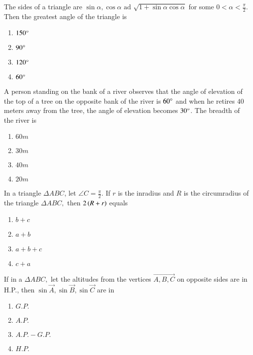 \item The sides of a triangle are $\sin\alpha,\cos\alpha \text{ ad } \sqrt{1+\sin\alpha\cos\alpha}$ for some $0<\alpha<\frac{\pi}{2}.$ Then the greatest angle of the triangle is \hfill{}
\begin{multicols}{4}
\begin{enumerate}
        \item $150\degree$                    
        \item $90\degree$ 
        \item $120\degree$
        \item $60\degree$
\end{enumerate}
\end{multicols} 

\item A person standing on the bank of a river observes that the angle of elevation of the top of a tree on the opposite bank of the river is $60\degree$ and when he retires $40$ meters away from the tree, the angle of elevation becomes $30\degree$. The breadth of the river is 

\hfill{}
\begin{multicols}{4}
\begin{enumerate}
        \item $60m$                    
        \item $30m$ 
        \item $40m$ 
        \item $20m$
\end{enumerate}
\end{multicols} 

\item In a triangle $\Delta{ABC}$, let $\angle{C}=\frac{\pi}{2}.$ If $r$ is the inradius and $R$ is the circumradius of the triangle $\Delta{ABC},$ then $2\left(R+r\right)$ equals \hfill{}
\begin{multicols}{4}
\begin{enumerate}
        \item $b+c$                    
        \item $a+b$ 
        \item $a+b+c$ 
        \item $c+a$
\end{enumerate}
\end{multicols} 

\item If in a $\Delta ABC,$ let the altitudes from the vertices $\vec{A,B,C}$ on opposite sides are in H.P., then $\sin \vec{A},\sin \vec{B},\sin \vec{C}$ are in \hfill{}
\begin{multicols}{4}
\begin{enumerate}
        \item $G.P.$                    
        \item $A.P.$ 
        \item $A.P.-G.P.$ 
        \item $H.P.$
\end{enumerate}
\end{multicols} 

